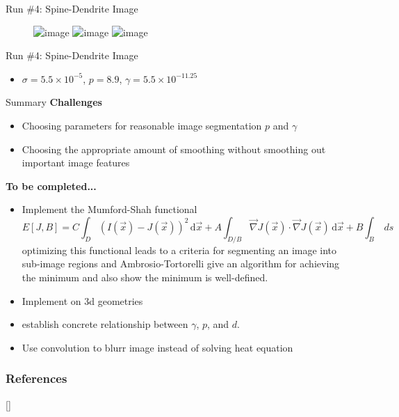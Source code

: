 \documentclass[xcolor=dvipsnames]{beamer}
\begin{document}
\begin{frame}{Run \#4: Spine-Dendrite Image}
    \begin{figure}[h!]
  \centering
  \begin{overprint}
  \includegraphics<1>[width=\linewidth]{ex4original.png}
  \includegraphics<2>[width=\linewidth]{ex4blurred.png}
  \includegraphics<3>[width=\linewidth]{ex4spd.png}
    \end{overprint}
\end{figure}
\end{frame}

\begin{frame}{Run \#4: Spine-Dendrite Image}
\begin{itemize}
    \item $\sigma = 5.5\times 10^{-5}$, $p=8.9$, $\gamma = 5.5\times 10^{-11.25}$
\end{itemize}
\end{frame}
\begin{frame}{Summary}
\textbf{Challenges}
\begin{itemize}
    \item Choosing parameters for reasonable image segmentation $p$ and $\gamma$
    \item Choosing the appropriate amount of smoothing without smoothing out important image features
\end{itemize}
\vspace{2mm}
\textbf{To be completed...}
\begin{itemize}
    \item Implement the Mumford-Shah functional \cite{doi:10.1002/cpa.3160430805}
\[
{\displaystyle E[J,B]=C\int _{D}(I({\vec {x}})-J({\vec {x}}))^{2}\,\mathrm {d} {\vec {x}}+A\int _{D/B}{\vec {\nabla }}J({\vec {x}})\cdot {\vec {\nabla }}J({\vec {x}})\,\mathrm {d} {\vec {x}}+B\int _{B}\ ds}
\]
optimizing this functional leads to a criteria for segmenting an image into sub-image regions and Ambrosio-Tortorelli give an algorithm for achieving the minimum and also show the minimum is well-defined.
    \item Implement on 3d geometries 
    \item establish concrete relationship between $\gamma$, $p$, and $d$.
    \item Use convolution to blurr image instead of solving heat equation
\end{itemize}
\end{frame}
\begin{frame}[allowframebreaks]
\frametitle{References}
{\tiny
{}[\theenumiv]
\nocite{*} 
% 

}
\end{frame}
\end{document}
